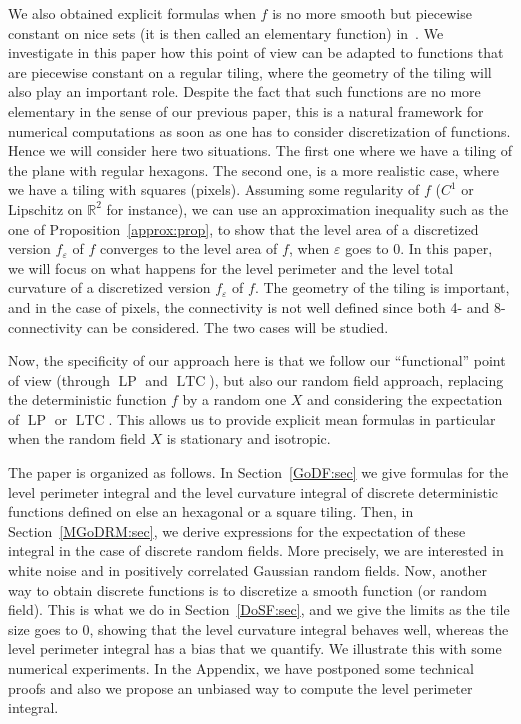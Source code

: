 \documentclass[AHL,Unicode,longabstracts,published]{cedram}
\newcommand{\R}{\mathbb{R}}
\newcommand{\eps}{\varepsilon}
\DeclareMathOperator{\LTC}{LTC}
\DeclareMathOperator{\LP}{LP}
\begin{document}
We also obtained explicit formulas when $f$ is no more smooth but piecewise constant on nice sets (it is then called an elementary function) in~\cite[Equation~(17) for $\LP$ and~(18) for $\LTC$]{BD-Geometry-published}. We investigate in this paper how this point of view can be adapted to functions that are piecewise constant on a regular tiling, where the geometry of the tiling will also play an important role. Despite the fact that such functions are no more elementary in the sense of our previous paper, this is a natural framework for numerical computations as soon as one has to consider discretization of functions. Hence we will consider here two situations. The first one where we have a tiling of the plane with regular hexagons. The second one, is a more realistic case, where we have a tiling with squares (pixels). Assuming some regularity of $f$ ($C^1$ or Lipschitz on $\R^2$ for instance), we can use an approximation inequality such as the one of Proposition~\ref{approx:prop}, to show that the level area of a discretized version $f_\eps$ of $f$ converges to the level area of $f$, when $\eps$ goes to $0$. In this paper, we will focus on what happens for the level perimeter and the level total curvature of a discretized version $f_\eps$ of $f$. The geometry of the tiling is important, and in the case of pixels, the connectivity is not well defined since both 4- and 8-connectivity can be considered. The two cases will be studied.


Now, the specificity of our approach here is that we follow our ``functional'' point of view (through $\LP$ and $\LTC$), but also our random field approach, replacing the deterministic function $f$ by a random one $X$ and considering the expectation of $\LP$ or $\LTC$. This allows us to provide explicit mean formulas in particular when the random field $X$ is stationary and isotropic.



The paper is organized as follows. In Section~\ref{GoDF:sec} we give formulas for the level perimeter integral and the level curvature integral of discrete deterministic functions defined on else an hexagonal or a square tiling. Then, in Section~\ref{MGoDRM:sec}, we derive expressions for the expectation of these integral in the case of discrete random fields. More precisely, we are interested in white noise and in positively correlated Gaussian random fields. Now, another way to obtain discrete functions is to discretize a smooth function (or random field). This is what we do in Section~\ref{DoSF:sec}, and we give the limits as the tile size goes to $0$, showing that the level curvature integral behaves well, whereas the level perimeter integral has a bias that we quantify. We illustrate this with some numerical experiments. In the Appendix, we have postponed some technical proofs and also we propose an unbiased way to compute the level perimeter integral.
\end{document}
